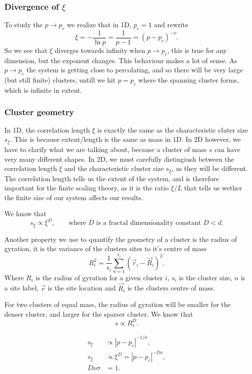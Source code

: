 \documentclass[a4paper, 11pt, notitlepage, english]{article}
\begin{document}
\subsubsection*{Divergence of $\xi$}
To study the $p\to p_c$ we realize that in 1D, $p_c = 1$ and rewrite
$$\xi = -\frac{1}{\ln p} = \frac{1}{p-1} = (p-p_c)^{-\nu}.$$
So we see that $\xi$ diverges towards infinity when $p \to p_c$, this is true for any dimension, but the exponent changes. This behaviour makes a lot of sense. As $p \to p_c$ the system is getting close to percolating, and so there will be very large (but still finite) clusters, untill we hit $p=p_c$ where the spanning cluster forms, which is infinite in extent.

\subsubsection*{Cluster geometry}

In 1D, the correlation length $\xi$ is exactly the same as the characteristic cluter size $s_\xi$. This is because extent/length is the same as mass in 1D. In 2D however, we have to clarify what we are talking about, because a cluster of mass $s$ can have very many different shapes. In 2D, we must carefully distingiush between the correlation length $\xi$ and the characteristic cluster size $s_\xi$, as they will be different. The correlation length tells us the extent of the system, and is therefore important for the finite scaling theory, as it is the ratio $\xi/L$ that tells us wether the finite size of our system affects our results.

We know that
$$s_\xi \propto \xi^D, \qquad \mbox{where } D \mbox{ is a fractal dimensionality constant } D < d.$$

Another property we use to quantify the geometry of a cluster is the radius of gyration, it is the variance of the clusters sites to it's centre of mass
$$R_i^2 = \frac{1}{s_i}\sum_{n=1}^{s_i} (\vec{r}_i - \vec{R}_i)^2.$$
Where $R_i$ is the radius of gyration for a given cluster $i$, $s_i$ is the cluster size, $n$ is a site label, $\vec{r}$ is the site location and $\vec{R}_i$ is the clusters centre of mass.

For two clusters of equal mass, the radius of gyration will be smaller for the denser cluster, and larger for the sparser cluster. We know that 
$$s \propto R_s^D.$$

\begin{align*}
s_\xi &\propto |p-p_c|^{-1/\sigma}, \\
s_\xi &\propto \xi^D = |p-p_c|^{-D\nu}, \\
D\nu\sigma &= 1.
\end{align*}
\end{document}
